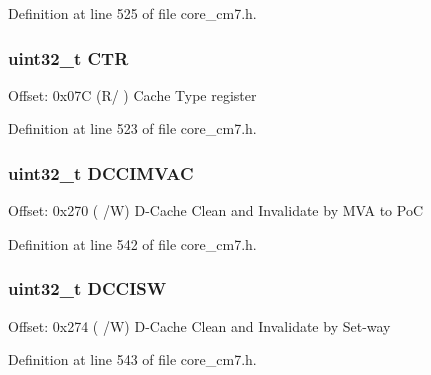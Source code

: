 Definition at line 525 of file core\+\_\+cm7.\+h.

\subsubsection[{\texorpdfstring{C\+TR}{CTR}}]{ uint32\+\_\+t C\+TR}\hypertarget{struct_s_c_b___type_aad937861e203bb05ae22c4369c458561}{}\label{struct_s_c_b___type_aad937861e203bb05ae22c4369c458561}
Offset\+: 0x07C (R/ ) Cache Type register 

Definition at line 523 of file core\+\_\+cm7.\+h.

\subsubsection[{\texorpdfstring{D\+C\+C\+I\+M\+V\+AC}{DCCIMVAC}}]{ uint32\+\_\+t D\+C\+C\+I\+M\+V\+AC}\hypertarget{struct_s_c_b___type_a18ef4bf4fbbb205544985598b1bb64f4}{}\label{struct_s_c_b___type_a18ef4bf4fbbb205544985598b1bb64f4}
Offset\+: 0x270 ( /W) D-\/\+Cache Clean and Invalidate by M\+VA to PoC 

Definition at line 542 of file core\+\_\+cm7.\+h.

\subsubsection[{\texorpdfstring{D\+C\+C\+I\+SW}{DCCISW}}]{ uint32\+\_\+t D\+C\+C\+I\+SW}\hypertarget{struct_s_c_b___type_ab6e447723358e736a9f69ffc88a97ba1}{}\label{struct_s_c_b___type_ab6e447723358e736a9f69ffc88a97ba1}
Offset\+: 0x274 ( /W) D-\/\+Cache Clean and Invalidate by Set-\/way 

Definition at line 543 of file core\+\_\+cm7.\+h.

